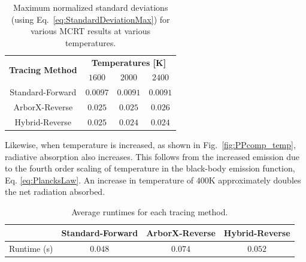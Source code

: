 \begin{table}
\centering
\caption{Maximum normalized standard deviations (using Eq.~\ref{eq:StandardDeviationMax}) for various MCRT results at various temperatures.}
\begin{tabular}{c c c c} 
\hline
\multirow{ 2}{*}{\bfseries Tracing Method} & 
\multicolumn{3}{c}{\bfseries Temperatures [K]} \\ [0.5ex] \cline{2-4}
 & $1600$ & $2000$ & $2400$ \\ [0.5ex]
 \hline
 Standard-Forward & $0.0097$ & $0.0091$ & $0.0091$ \\ [0.5ex] 
 ArborX-Reverse & $0.025$ & $0.025$ & $0.026$ \\ [0.5ex] 
 Hybrid-Reverse & $0.025$ & $0.024$ & $0.024$ \\ [0.5ex] 
 \hline
\end{tabular}
\label{table:PPcomp_temp}
\end{table}

Likewise, when temperature is increased, as shown in Fig.~\ref{fig:PPcomp_temp}, radiative absorption also increases. This follows from the increased emission due to the fourth order scaling of temperature in the black-body emission function, Eq. \ref{eq:PlancksLaw}.
An increase in temperature of $400$K approximately doubles the net radiation absorbed.



\begin{table}
\centering
\caption{Average runtimes for each tracing method.}
\begin{tabular}{c c c c} 
\hline
 & Standard-Forward & ArborX-Reverse & Hybrid-Reverse \\ [0.5ex]
 \hline
 Runtime (s) & $0.048$ & $0.074$ & $0.052$ \\ [0.5ex] 
 \hline
\end{tabular}
\label{table:PP_runtimes}
\end{table}

